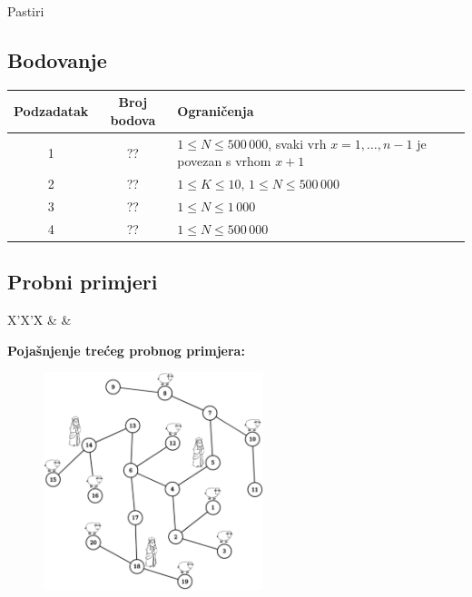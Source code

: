\begin{statement}[
  problempoints=100,
  timelimit=1 sekunda,
  memorylimit=512 MiB,
]{Pastiri}
\subsection*{Bodovanje}
{\renewcommand{\arraystretch}{1.4}
  \setlength{\tabcolsep}{6pt}
  \begin{tabular}{ccl}
 Podzadatak & Broj bodova & Ograničenja \\ \midrule
  1 & ?? & $1 \le N \le 500\,000$, svaki vrh $x = 1, \dots, n-1$ je povezan s vrhom $x + 1$\\
  2 & ?? & $1 \le K \le 10, \, 1 \le N \le 500\,000$ \\
  3 & ?? & $1 \le N \le 1\,000$ \\
  4 & ?? & $1 \le N \le 500\,000$ \\
\end{tabular}}

\subsection*{Probni primjeri}
\begin{tabularx}{\textwidth}{X'X'X}
 &
 &
\end{tabularx}

\textbf{Pojašnjenje trećeg probnog primjera:}
\begin{figure}[H]
\centering
\includegraphics[width=0.57\textwidth]{img/pastiri_tp.png}
\end{figure}

\end{statement}

